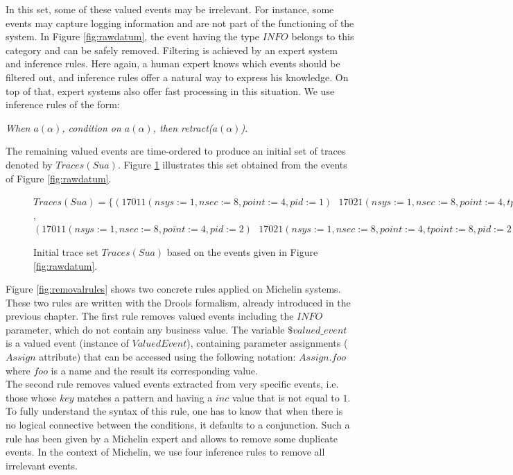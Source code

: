 In this set, some of these valued events may be irrelevant.  For
instance, some events may capture logging information and are not
part of the functioning of the system. In Figure
\ref{fig:rawdatum}, the event having the type $INFO$
belongs to this category and can be safely removed. Filtering is
achieved by an expert system and inference rules. Here again, a
human expert knows which events should be filtered out, and
inference rules offer a natural way to express his knowledge. On
top of that, expert systems also offer fast processing in this
situation. We use inference rules of the form:

\textit{When $a(\alpha)$, condition on $a(\alpha)$, then
retract($a(\alpha)$)}.

The remaining valued events are time-ordered to produce an
initial set of traces denoted by $Traces(Sua)$. Figure
\ref{fig:tsua} illustrates this set obtained from the events of
Figure \ref{fig:rawdatum}.

\begin{figure}[ht]
\begin{framed}
    $Traces(Sua) = \{
    (17011(nsys:=1,nsec:=8,point:=4,pid:=1)\text{ }
    17021(nsys:=1,nsec:=8,point:=4,tpoint:=8,pid:=1))$,
    $(17011(nsys:=1,nsec:=8,point:=4,pid:=2)\text{ }
    17021(nsys:=1,nsec:=8,point:=4,tpoint:=8,pid:=2)) \}$
\end{framed}

\caption{Initial trace set $Traces(Sua)$ based on the events
given in Figure \ref{fig:rawdatum}.}
\label{fig:tsua}
\end{figure}

Figure \ref{fig:removalrules} shows two concrete rules applied on
Michelin systems. These two rules are written with the Drools
formalism, already introduced in the previous chapter. The first
rule removes valued events including the $INFO$ parameter,
which do not contain any business value. The variable
$\$valued\_event$ is a valued event (instance of $ValuedEvent$),
containing parameter assignments ($Assign$ attribute) that can be
accessed using the following notation: $Assign.foo$ where $foo$
is a name and the result its corresponding value.\\The second
rule removes valued events extracted from very specific events,
i.e. those whose $key$ matches a pattern and having a $inc$ value
that is not equal to $1$.  To fully understand the syntax of this
rule, one has to know that when there is no logical connective
between the conditions, it defaults to a conjunction.  Such a
rule has been given by a Michelin expert and allows to remove
some duplicate events.  In the context of Michelin, we use four
inference rules to remove all irrelevant events.

